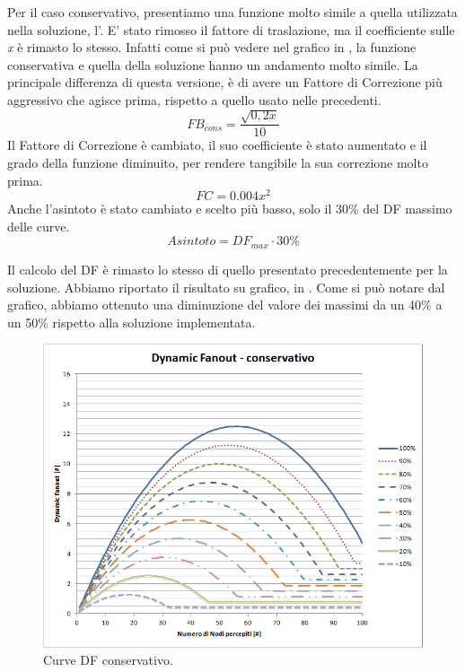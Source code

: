 Per il caso conservativo, presentiamo una funzione molto simile a quella utilizzata nella soluzione, l'. E' stato rimosso il fattore di traslazione, ma il coefficiente sulle \textit{x} è rimasto lo stesso. Infatti come si può vedere nel grafico in , la funzione conservativa e quella della soluzione hanno un andamento molto simile. La principale differenza di questa versione, è di avere un Fattore di Correzione più aggressivo che agisce prima, rispetto a quello usato nelle precedenti.
\begin{equation}
	FB_{cons}=\dfrac{\sqrt{0,2x}}{10}\nonumber
\end{equation}
Il Fattore di Correzione è cambiato, il suo coefficiente è stato aumentato e il grado della funzione diminuito, per rendere tangibile la sua correzione molto prima.
\begin{equation}
	FC = 0.004x^2
\end{equation}
Anche l'asintoto è stato cambiato e scelto più basso, solo il 30\% del DF massimo delle curve.
\begin{equation}
	Asintoto = DF_{max}\cdot 30\%
\end{equation}

Il calcolo del DF è rimasto lo stesso di quello presentato precedentemente per la soluzione. Abbiamo riportato il risultato su grafico, in . Come si può notare dal grafico, abbiamo ottenuto una diminuzione del valore dei massimi da un 40\% a un 50\% rispetto alla soluzione implementata.
\begin{figure}[t]
	\centering
	\includegraphics[width=0.9\linewidth]{Images/grafici_usati/DF_conservativo_tot_no_arr}
	\caption[DF conservativo]{Curve DF conservativo.}
	\label{fig:DF_conservativo_tot_no_arr}
\end{figure}
\bigskip



